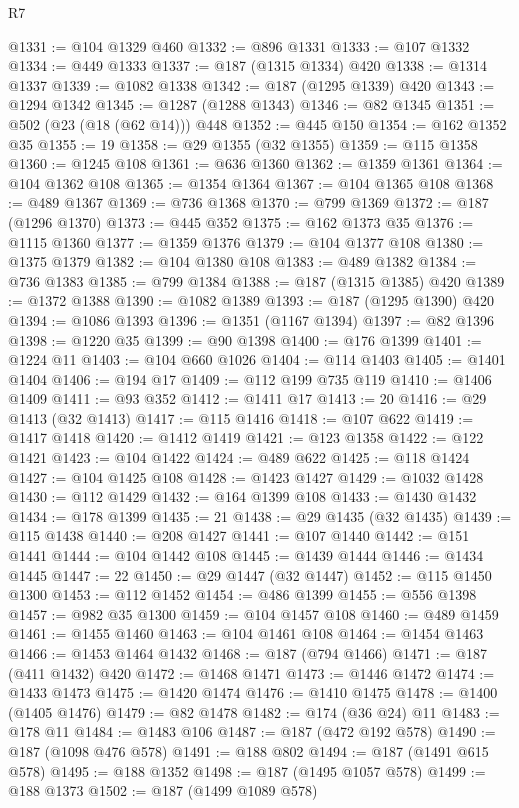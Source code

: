 \begin{lexlean}{R7}
\begin{coremodule}
@1331 := @104 @1329 @460
@1332 := @896 @1331
@1333 := @107 @1332
@1334 := @449 @1333
@1337 := @187 (@1315 @1334) @420
@1338 := @1314 @1337
@1339 := @1082 @1338
@1342 := @187 (@1295 @1339) @420
@1343 := @1294 @1342
@1345 := @1287 (@1288 @1343)
@1346 := @82 @1345
@1351 := @502 (@23 (@18 (@62 @14))) @448
@1352 := @445 @150
@1354 := @162 @1352 @35
@1355 := 19
@1358 := @29 @1355 (@32 @1355)
@1359 := @115 @1358
@1360 := @1245 @108
@1361 := @636 @1360
@1362 := @1359 @1361
@1364 := @104 @1362 @108
@1365 := @1354 @1364
@1367 := @104 @1365 @108
@1368 := @489 @1367
@1369 := @736 @1368
@1370 := @799 @1369
@1372 := @187 (@1296 @1370)
@1373 := @445 @352
@1375 := @162 @1373 @35
@1376 := @1115 @1360
@1377 := @1359 @1376
@1379 := @104 @1377 @108
@1380 := @1375 @1379
@1382 := @104 @1380 @108
@1383 := @489 @1382
@1384 := @736 @1383
@1385 := @799 @1384
@1388 := @187 (@1315 @1385) @420
@1389 := @1372 @1388
@1390 := @1082 @1389
@1393 := @187 (@1295 @1390) @420
@1394 := @1086 @1393
@1396 := @1351 (@1167 @1394)
@1397 := @82 @1396
@1398 := @1220 @35
@1399 := @90 @1398
@1400 := @176 @1399
@1401 := @1224 @11
@1403 := @104 @660 @1026
@1404 := @114 @1403
@1405 := @1401 @1404
@1406 := @194 @17
@1409 := @112 @199 @735 @119
@1410 := @1406 @1409
@1411 := @93 @352
@1412 := @1411 @17
@1413 := 20
@1416 := @29 @1413 (@32 @1413)
@1417 := @115 @1416
@1418 := @107 @622
@1419 := @1417 @1418
@1420 := @1412 @1419
@1421 := @123 @1358
@1422 := @122 @1421
@1423 := @104 @1422
@1424 := @489 @622
@1425 := @118 @1424
@1427 := @104 @1425 @108
@1428 := @1423 @1427
@1429 := @1032 @1428
@1430 := @112 @1429
@1432 := @164 @1399 @108
@1433 := @1430 @1432
@1434 := @178 @1399
@1435 := 21
@1438 := @29 @1435 (@32 @1435)
@1439 := @115 @1438
@1440 := @208 @1427
@1441 := @107 @1440
@1442 := @151 @1441
@1444 := @104 @1442 @108
@1445 := @1439 @1444
@1446 := @1434 @1445
@1447 := 22
@1450 := @29 @1447 (@32 @1447)
@1452 := @115 @1450 @1300
@1453 := @112 @1452
@1454 := @486 @1399
@1455 := @556 @1398
@1457 := @982 @35 @1300
@1459 := @104 @1457 @108
@1460 := @489 @1459
@1461 := @1455 @1460
@1463 := @104 @1461 @108
@1464 := @1454 @1463
@1466 := @1453 @1464 @1432
@1468 := @187 (@794 @1466)
@1471 := @187 (@411 @1432) @420
@1472 := @1468 @1471
@1473 := @1446 @1472
@1474 := @1433 @1473
@1475 := @1420 @1474
@1476 := @1410 @1475
@1478 := @1400 (@1405 @1476)
@1479 := @82 @1478
@1482 := @174 (@36 @24) @11
@1483 := @178 @11
@1484 := @1483 @106
@1487 := @187 (@472 @192 @578)
@1490 := @187 (@1098 @476 @578)
@1491 := @188 @802
@1494 := @187 (@1491 @615 @578)
@1495 := @188 @1352
@1498 := @187 (@1495 @1057 @578)
@1499 := @188 @1373
@1502 := @187 (@1499 @1089 @578)

\end{coremodule}
\end{lexlean}
